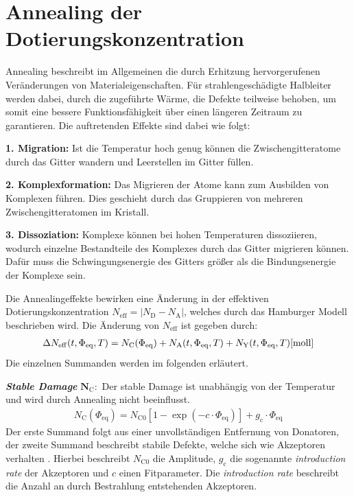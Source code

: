 \section{Annealing der Dotierungskonzentration}
Annealing beschreibt im Allgemeinen die durch Erhitzung hervorgerufenen Veränderungen von Materialeigenschaften. Für strahlengeschädigte
Halbleiter werden dabei, durch die zugeführte Wärme, die Defekte teilweise behoben, um somit eine
bessere Funktionsfähigkeit über einen längeren Zeitraum zu garantieren. Die auftretenden Effekte sind dabei wie folgt:

\textbf{1. Migration:} Ist die Temperatur hoch genug können die Zwischengitteratome durch das Gitter wandern und
Leerstellen im Gitter füllen.

\textbf{2. Komplexformation:} Das Migrieren der Atome kann zum Ausbilden von Komplexen führen. Dies geschieht durch das
Gruppieren von mehreren Zwischengitteratomen im Kristall.

\textbf{3. Dissoziation:} Komplexe können bei hohen Temperaturen dissoziieren, wodurch einzelne Bestandteile des Komplexes
durch das Gitter migrieren können. Dafür muss die Schwingungsenergie des Gitters größer als die Bindungsenergie der Komplexe sein.

Die Annealingeffekte bewirken eine Änderung in der effektiven Dotierungskonzentration
${N_{\mathrm{eff}}= |N_{\mathrm{D}}-N_{\mathrm{A}}|}$,
welches durch das Hamburger Modell beschrieben wird.
Die Änderung von $N_{\mathrm{eff}}$ ist gegeben durch:
\begin{align}
  \Delta N_{\mathrm{eff}}(t, \Phi_{\mathrm{eq}}, T)   = N_{\mathrm{C}}(\Phi_{\mathrm{eq}}) + N_{\mathrm{A}}(t, \Phi_{\mathrm{eq}}, T) + N_{\mathrm{Y}}(t, \Phi_{\mathrm{eq}}, T) \text{\cite{moll}}
  \label{eqn:N_eff}
\end{align}
Die einzelnen Summanden werden im folgenden erläutert.

\textbf{\textit{Stable Damage}} $\symbf{N_{\mathrm{C}}}:$ Der stable Damage ist unabhängig von der Temperatur und wird durch Annealing nicht beeinflusst.
\begin{align}
  N_{\mathrm{C}}(\Phi_{\mathrm{eq}}) = N_{\mathrm{C0}}[1-\exp{(-c \cdot \Phi_{\mathrm{eq}})}] + g_{\mathrm{c}} \cdot \Phi_{\mathrm{eq}}
\end{align}
Der erste Summand folgt aus einer unvollständigen Entfernung von Donatoren, der zweite Summand beschreibt stabile Defekte, welche sich wie Akzeptoren verhalten \cite{beyer}.
Hierbei beschreibt $N_{\mathrm{C0}}$ die Amplitude, $g_{\mathrm{c}}$ die sogenannte \textit{introduction rate} der Akzeptoren und $c$ einen Fitparameter.
Die \textit{introduction rate} beschreibt die Anzahl an durch Bestrahlung entstehenden Akzeptoren.

